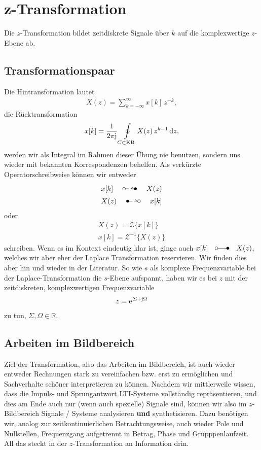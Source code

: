 \clearpage
\section{z-Transformation}
%
Die $z$-Transformation bildet zeitdiskrete Signale über $k$ auf die
komplexwertige $z$-Ebene ab.
\subsection*{Transformationspaar}
Die Hintransformation lautet
\begin{align}
X(z) = \sum_{k=-\infty}^{\infty} x[k] \, z^{-k},
\end{align}
die Rücktransformation
\begin{align}
x[k] = \frac{1}{2\pi \im} \oint\limits_{C \subset \text{KB}} X(z) \, z^{k-1} \, \fsd z,
\end{align}
werden wir als Integral im Rahmen dieser Übung nie benutzen, sondern uns
wieder mit bekannten Korrespondenzen behelfen.
Als verkürzte Operatorschreibweise können wir entweder
\begin{align}
x[k] \quad\ztransf\quad X(z)\\
X(z) \quad\Ztransf\quad x[k]
\end{align}
oder
\begin{align}
X(z) = \mathcal{Z}\{x[k]\} \\
x[k] = \mathcal{Z}^{-1}\{X(z)\}
\end{align}
schreiben.
Wenn es im Kontext eindeutig klar ist, ginge auch $x[k] \quad\laplace\quad X(z)$,
welches wir aber eher der Laplace Transformation reservieren. Wir finden dies
aber hin und wieder in der Literatur.
%
So wie $s$ als komplexe Frequenzvariable bei der Laplace-Transformation die
$s$-Ebene aufspannt, haben wir es bei $z$ mit der zeitdiskreten, komplexwertigen
Frequenzvariable
\begin{align}
z = \e^{\Sigma + \im \Omega}
\end{align}
zu tun, $\Sigma,\Omega\in\mathbb{R}$.
%
\subsection*{Arbeiten im Bildbereich}
Ziel der Transformation, also das Arbeiten im Bildbereich, ist auch wieder
entweder Rechnungen stark zu vereinfachen bzw. erst zu ermöglichen und
Sachverhalte schöner interpretieren zu können.
%
Nachdem wir mittlerweile wissen, dass die Impuls- und Sprungantwort LTI-Systeme
vollständig repräsentieren, und dies am Ende auch nur (wenn auch spezielle)
Signale sind, können wir also im $z$-Bildbereich Signale / Systeme
analysieren \textbf{und} synthetisieren.
%
Dazu benötigen wir, analog zur zeitkontinuierlichen Betrachtungsweise, auch
wieder Pole und Nullstellen, Frequenzgang aufgetrennt in Betrag, Phase und
Grupppenlaufzeit. All das steckt in der $z$-Transformation an Information drin.
%
